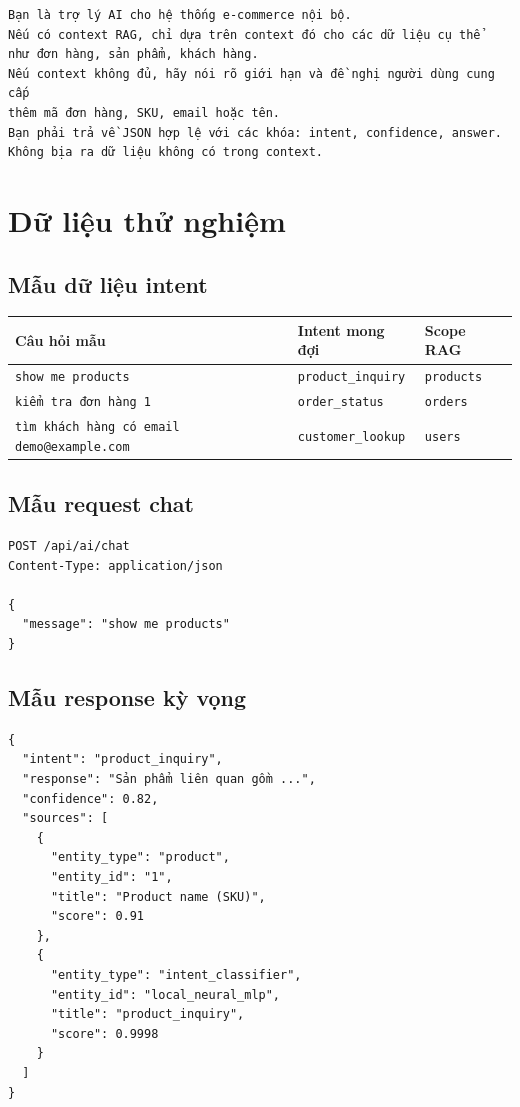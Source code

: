 \documentclass[12pt,a4paper]{report}
\begin{document}
\begin{lstlisting}[style=code,caption={Ràng buộc quan trọng trong prompt}]
Bạn là trợ lý AI cho hệ thống e-commerce nội bộ.
Nếu có context RAG, chỉ dựa trên context đó cho các dữ liệu cụ thể
như đơn hàng, sản phẩm, khách hàng.
Nếu context không đủ, hãy nói rõ giới hạn và đề nghị người dùng cung cấp
thêm mã đơn hàng, SKU, email hoặc tên.
Bạn phải trả về JSON hợp lệ với các khóa: intent, confidence, answer.
Không bịa ra dữ liệu không có trong context.
\end{lstlisting}

\section{Dữ liệu thử nghiệm}
\subsection{Mẫu dữ liệu intent}
\begin{longtable}{p{6cm}p{4cm}p{3.2cm}}
\toprule
\textbf{Câu hỏi mẫu} & \textbf{Intent mong đợi} & \textbf{Scope RAG} \\
\midrule
\texttt{show me products} & \texttt{product\_inquiry} & \texttt{products} \\
\texttt{kiểm tra đơn hàng 1} & \texttt{order\_status} & \texttt{orders} \\
\texttt{tìm khách hàng có email demo@example.com} & \texttt{customer\_lookup} & \texttt{users} \\
\bottomrule
\end{longtable}

\subsection{Mẫu request chat}
\begin{lstlisting}[style=code,caption={Request test chatbot}]
POST /api/ai/chat
Content-Type: application/json

{
  "message": "show me products"
}
\end{lstlisting}

\subsection{Mẫu response kỳ vọng}
\begin{lstlisting}[style=code,caption={Response dạng rút gọn}]
{
  "intent": "product_inquiry",
  "response": "Sản phẩm liên quan gồm ...",
  "confidence": 0.82,
  "sources": [
    {
      "entity_type": "product",
      "entity_id": "1",
      "title": "Product name (SKU)",
      "score": 0.91
    },
    {
      "entity_type": "intent_classifier",
      "entity_id": "local_neural_mlp",
      "title": "product_inquiry",
      "score": 0.9998
    }
  ]
}
\end{lstlisting}
\end{document}

